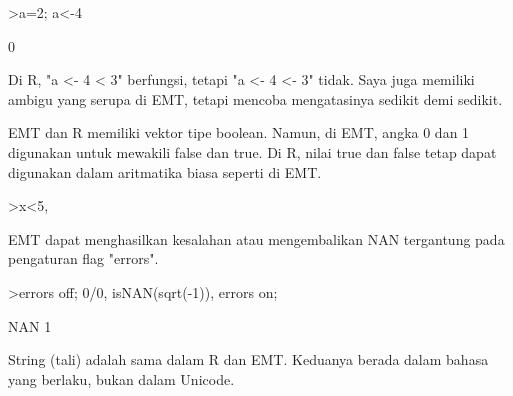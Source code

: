\documentclass[a4paper,10pt]{article}
\begin{document}
\begin{eulernotebook}
\begin{eulercomment}
\begin{eulercomment}
\begin{eulercomment}
\begin{eulercomment}
\begin{eulerprompt}
>a=2; a<-4
\end{eulerprompt}
\begin{euleroutput}
  0
\end{euleroutput}
\begin{eulercomment}
Di R, "a \textless{}- 4 \textless{} 3" berfungsi, tetapi "a \textless{}- 4 \textless{}- 3" tidak. Saya juga
memiliki ambigu yang serupa di EMT, tetapi mencoba mengatasinya
sedikit demi sedikit.

EMT dan R memiliki vektor tipe boolean. Namun, di EMT, angka 0 dan 1
digunakan untuk mewakili false dan true. Di R, nilai true dan false
tetap dapat digunakan dalam aritmatika biasa seperti di EMT.
\end{eulercomment}
\begin{eulerprompt}
>x<5, %
\end{eulerprompt}
\begin{euleroutput}
  [0,  0,  1,  0,  0]
  [0,  0,  3.1,  0,  0]
\end{euleroutput}
\begin{eulercomment}
EMT dapat menghasilkan kesalahan atau mengembalikan NAN tergantung
pada pengaturan flag "errors".
\end{eulercomment}
\begin{eulerprompt}
>errors off; 0/0, isNAN(sqrt(-1)), errors on;
\end{eulerprompt}
\begin{euleroutput}
  NAN
  1
\end{euleroutput}
\begin{eulercomment}
String (tali) adalah sama dalam R dan EMT. Keduanya berada dalam
bahasa yang berlaku, bukan dalam Unicode.


\end{eulercomment}
\end{eulercomment}
\end{eulercomment}
\end{eulercomment}
\end{eulercomment}
\end{eulernotebook}
\end{document}
